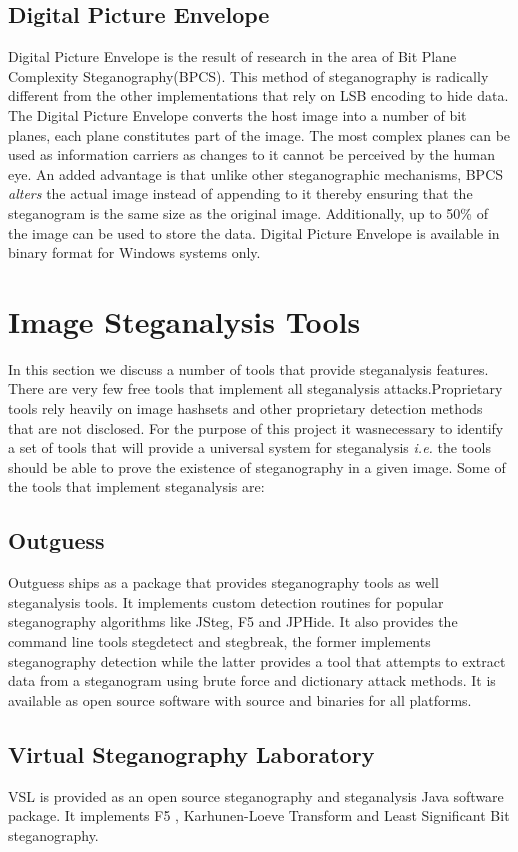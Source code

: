  \subsection{Digital Picture Envelope}
 Digital Picture Envelope is the result of research \cite{kawaguchi1998concept} in the area of Bit Plane Complexity Steganography(BPCS). This method of steganography is radically different from the other implementations that rely on LSB encoding to hide data. The Digital Picture Envelope converts the host image into a number of bit planes, each plane constitutes part of the image. The most complex planes can be used as information carriers as changes to it cannot be perceived by the human eye.  An added advantage is that unlike other steganographic mechanisms, BPCS \emph{alters} the actual image instead of appending to it thereby ensuring that the steganogram is the same size as the original image. Additionally, up to 50\% of the image can be used to store the data. Digital Picture Envelope is available in binary format for Windows systems only. 
 
\section{Image Steganalysis Tools}
\label{sec:steganalysistools}
In this section we discuss a number of tools that provide steganalysis features. There are very few free tools that implement all steganalysis attacks.Proprietary tools rely heavily on image hashsets and other proprietary detection methods that are not disclosed. For the purpose of this project it wasnecessary to identify a set of tools that will provide a universal system for steganalysis \emph{i.e.} the tools should be able to prove the existence of steganography in a given image. Some of the tools that implement steganalysis are:
\subsection{Outguess}  Outguess \cite{outguess} ships as a package that provides steganography tools as well steganalysis tools. It implements custom detection routines for popular steganography algorithms like JSteg, F5 and JPHide. It also provides the command line tools stegdetect and stegbreak, the former implements steganography detection while the latter provides a tool that attempts to extract data from a steganogram using brute force and dictionary attack methods. It is available as open source software with source and binaries for all platforms. 
\subsection{Virtual Steganography Laboratory} VSL \cite{wegrzyn2009} is provided as an open source steganography and steganalysis Java software package. It implements F5 \cite{westfeld2001f5}, Karhunen-Loeve Transform \cite{stanescu2007digital} and Least Significant Bit steganography.
